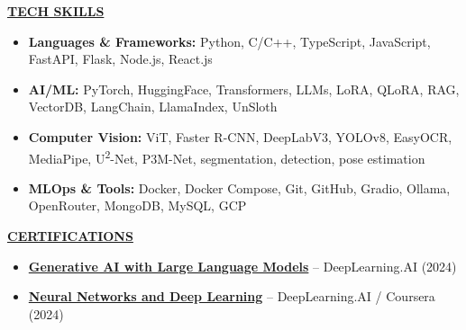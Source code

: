 \documentclass[a4paper,11pt]{article}
\newcommand{\BlackBold}[1]{\textbf{#1}}
\newcommand{\SectionHeader}[1]{%
  \vspace{2mm}%
  \begin{center}
    {\large\textbf{\underline{#1}}}%
  \end{center}
  \vspace{-2mm}%
}
\begin{document}
\SectionHeader{TECH SKILLS}
{\normalsize
\begin{itemize}
  \item \BlackBold{Languages \& Frameworks:} Python, C/C++, TypeScript, JavaScript, FastAPI, Flask, Node.js, React.js
  \item \BlackBold{AI/ML:} PyTorch, HuggingFace, Transformers, LLMs, LoRA, QLoRA, RAG, VectorDB, LangChain, LlamaIndex, UnSloth
  \item \BlackBold{Computer Vision:} ViT, Faster R-CNN, DeepLabV3, YOLOv8, EasyOCR, MediaPipe, U\textsuperscript{2}-Net, P3M-Net, segmentation, detection, pose estimation
  \item \BlackBold{MLOps \& Tools:} Docker, Docker Compose, Git, GitHub, Gradio, Ollama, OpenRouter, MongoDB, MySQL, GCP
\end{itemize}
}

\SectionHeader{CERTIFICATIONS}
{\normalsize
\begin{itemize}
  \item \href{https://coursera.org/share/66820de848d0b272fa5bef8239e27c54}{\BlackBold{Generative AI with Large Language Models}} -- DeepLearning.AI (2024)
  \item \href{https://coursera.org/share/f7c868b141a2761a5a0d7bc1da42d67d}{\BlackBold{Neural Networks and Deep Learning}} -- DeepLearning.AI / Coursera (2024)
\end{itemize}
}
\end{document}
